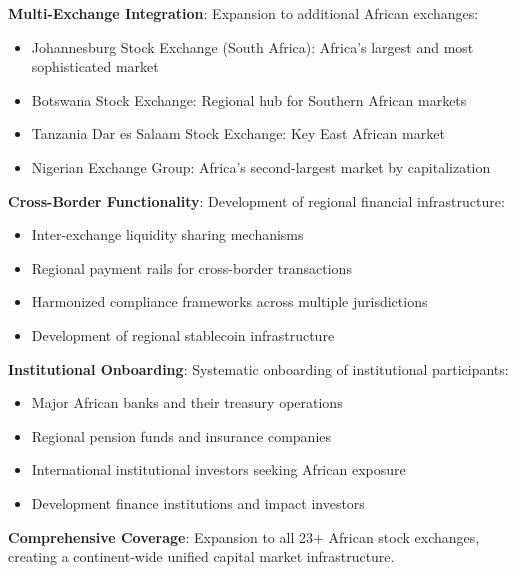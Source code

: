 \documentclass[12pt]{article}
\begin{document}
\textbf{Multi-Exchange Integration}: Expansion to additional African exchanges:
\begin{itemize}
	\item Johannesburg Stock Exchange (South Africa): Africa's largest and most sophisticated market
	\item Botswana Stock Exchange: Regional hub for Southern African markets
	\item Tanzania Dar es Salaam Stock Exchange: Key East African market
	\item Nigerian Exchange Group: Africa's second-largest market by capitalization

\end{itemize}
\textbf{Cross-Border Functionality}: Development of regional financial infrastructure:
\begin{itemize}
	\item Inter-exchange liquidity sharing mechanisms
	\item Regional payment rails for cross-border transactions
	\item Harmonized compliance frameworks across multiple jurisdictions
	\item Development of regional stablecoin infrastructure

\end{itemize}
\textbf{Institutional Onboarding}: Systematic onboarding of institutional participants:
\begin{itemize}
	\item Major African banks and their treasury operations
	\item Regional pension funds and insurance companies
	\item International institutional investors seeking African exposure
	\item Development finance institutions and impact investors

\end{itemize}

\textbf{Comprehensive Coverage}: Expansion to all 23+ African stock exchanges, creating a continent-wide unified capital market infrastructure.
\end{document}
